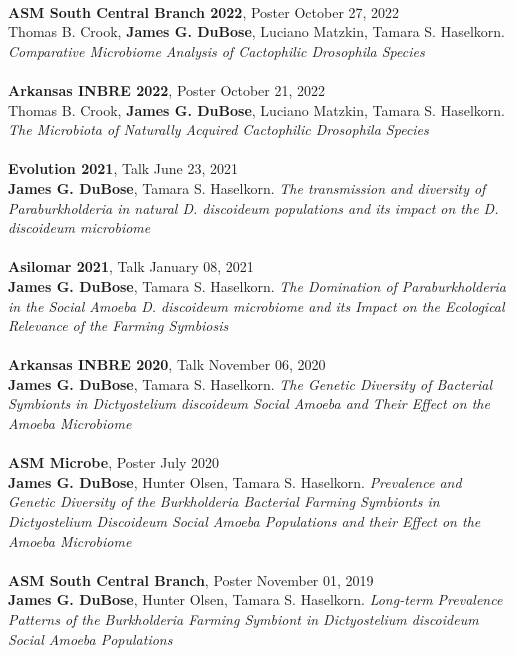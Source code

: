 \documentclass{article}
\begin{document}
\\
\textbf{ASM South Central Branch 2022}, Poster \hfill October 27, 2022\\
Thomas B. Crook, \textbf{James G. DuBose}, Luciano Matzkin, Tamara S. Haselkorn. \emph{Comparative Microbiome Analysis of Cactophilic Drosophila Species}\\
\\
\textbf{Arkansas INBRE 2022}, Poster \hfill October 21, 2022\\
Thomas B. Crook, \textbf{James G. DuBose}, Luciano Matzkin, Tamara S. Haselkorn. \emph{The Microbiota of Naturally Acquired Cactophilic Drosophila Species}\\
\\
\textbf{Evolution 2021}, Talk \hfill June 23, 2021\\
\textbf{James G. DuBose}, Tamara S. Haselkorn. \emph{The transmission and diversity of Paraburkholderia in natural D. discoideum populations and its impact on the D. discoideum microbiome}\\
\\
\textbf{Asilomar 2021}, Talk \hfill January 08, 2021\\
\textbf{James G. DuBose}, Tamara S. Haselkorn. \emph{The Domination of Paraburkholderia in the Social Amoeba D. discoideum microbiome and its Impact on the Ecological Relevance of the Farming Symbiosis}\\
\\
\textbf{Arkansas INBRE 2020}, Talk \hfill November 06, 2020\\
\textbf{James G. DuBose}, Tamara S. Haselkorn. \emph{The Genetic Diversity of Bacterial Symbionts in Dictyostelium discoideum Social Amoeba and Their Effect on the Amoeba Microbiome}\\
\\
\textbf{ASM Microbe}, Poster \hfill July 2020\\
\textbf{James G. DuBose}, Hunter Olsen, Tamara S. Haselkorn. \emph{Prevalence and Genetic Diversity
of the Burkholderia Bacterial Farming Symbionts in Dictyostelium Discoideum Social Amoeba Populations and their Effect on the Amoeba Microbiome}\\
\\
\textbf{ASM South Central Branch}, Poster \hfill November 01, 2019\\
\textbf{James G. DuBose}, Hunter Olsen, Tamara S. Haselkorn. \emph{Long-term Prevalence Patterns of the Burkholderia Farming Symbiont in Dictyostelium discoideum Social Amoeba Populations}
\\
\end{document}
